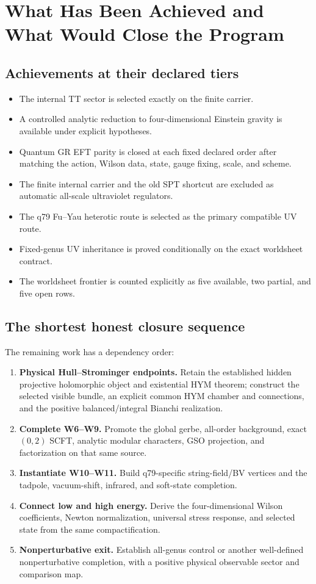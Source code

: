 \documentclass[11pt]{article}
\begin{document}
\section{What Has Been Achieved and What Would Close the Program}

\subsection{Achievements at their declared tiers}

\begin{itemize}
\item The internal TT sector is selected exactly on the finite carrier.
\item A controlled analytic reduction to four-dimensional Einstein gravity
is available under explicit hypotheses.
\item Quantum GR EFT parity is closed at each fixed declared order after
matching the action, Wilson data, state, gauge fixing, scale, and scheme.
\item The finite internal carrier and the old SPT shortcut are excluded as
automatic all-scale ultraviolet regulators.
\item The q79 Fu--Yau heterotic route is selected as the primary compatible
UV route.
\item Fixed-genus UV inheritance is proved conditionally on the exact
worldsheet contract.
\item The worldsheet frontier is counted explicitly as five available, two
partial, and five open rows.
\end{itemize}

\subsection{The shortest honest closure sequence}

The remaining work has a dependency order:
\begin{enumerate}
\item \textbf{Physical Hull--Strominger endpoints.} Retain the established
hidden projective holomorphic object and existential HYM theorem; construct
the selected visible bundle, an explicit common HYM chamber and connections,
and the positive balanced/integral Bianchi realization.
\item \textbf{Complete W6--W9.} Promote the global gerbe, all-order
background, exact \((0,2)\) SCFT, analytic modular characters, GSO
projection, and factorization on that same source.
\item \textbf{Instantiate W10--W11.} Build q79-specific string-field/BV
vertices and the tadpole, vacuum-shift, infrared, and soft-state completion.
\item \textbf{Connect low and high energy.} Derive the four-dimensional
Wilson coefficients, Newton normalization, universal stress response, and
selected state from the same compactification.
\item \textbf{Nonperturbative exit.} Establish all-genus control or another
well-defined nonperturbative completion, with a positive physical observable
sector and comparison map.
\end{enumerate}
\end{document}
